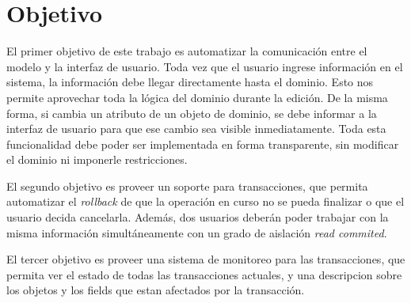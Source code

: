\section{Objetivo}
\label{sec:Objetivo}
El primer objetivo de este trabajo es automatizar la comunicación entre el
modelo y la interfaz de usuario.
Toda vez que el usuario ingrese información en el sistema, la
información debe llegar directamente hasta el dominio. Esto nos permite
aprovechar toda la lógica del dominio durante la edición.
De la misma forma, si cambia un atributo de un objeto de dominio, se debe
informar a la interfaz de usuario para que ese cambio sea visible
inmediatamente.
Toda esta funcionalidad debe poder ser implementada en forma transparente,
sin modificar el dominio ni imponerle restricciones.

El segundo objetivo es proveer un soporte para transacciones, que
permita automatizar el \emph{rollback} de que la operación en curso no se pueda
finalizar o que el usuario decida cancelarla.
Además, dos usuarios deberán poder trabajar con la misma información
simultáneamente con un grado de aislación \emph{read commited}.

El tercer objetivo es proveer una sistema de monitoreo para las transacciones,
que permita ver el estado de todas las transacciones actuales, y una descripcion
sobre los objetos y los fields que estan afectados por la transacción.
